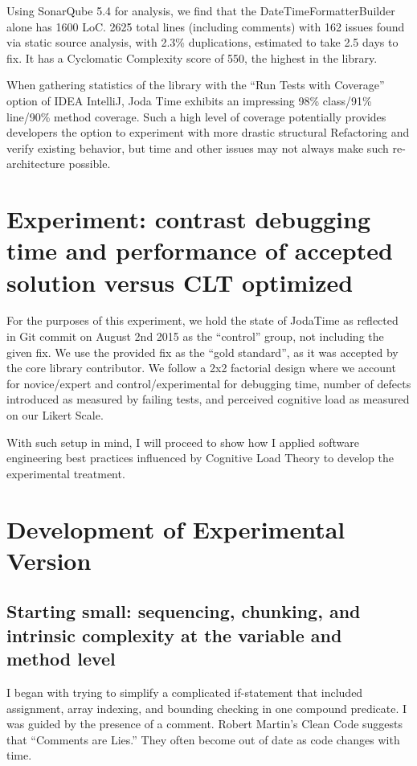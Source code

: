 Using SonarQube 5.4 for analysis, we find that the DateTimeFormatterBuilder alone has 1600 LoC. 2625 total lines (including comments) with 162 issues found via static source analysis, with 2.3\% duplications, estimated to take 2.5 days to fix. It has a Cyclomatic Complexity score of 550, the highest in the library.

When gathering statistics of the library with the “Run Tests with Coverage” option of IDEA IntelliJ, Joda Time exhibits an impressing 98\% class/91\% line/90\% method coverage. Such a high level of coverage potentially provides developers the option to experiment with more drastic structural Refactoring and verify existing behavior, but time and other issues may not always make such re-architecture possible.



\section{Experiment: contrast debugging time and performance of accepted solution versus CLT optimized}

For the purposes of this experiment, we hold the state of JodaTime as reflected in Git commit on August 2nd 2015 as the “control” group, not including the given fix. We use the provided fix as the “gold standard”, as it was accepted by the core library contributor. We follow a 2x2 factorial design where we account for novice/expert and control/experimental for debugging time, number of defects introduced as measured by failing tests, and perceived cognitive load as measured on our Likert Scale. 

With such setup in mind, I will proceed to show how I applied software engineering best practices influenced by Cognitive Load Theory to develop the experimental treatment.

\section{Development of Experimental Version}

\subsection{Starting small: sequencing, chunking, and intrinsic complexity at the variable and method level}
I began with trying to simplify a complicated if-statement that included assignment, array indexing, and bounding checking in one compound predicate. I was guided by the presence of a comment. Robert Martin’s Clean Code suggests that “Comments are Lies.” They often become out of date as code changes with time. 


